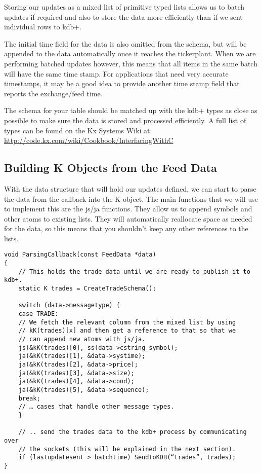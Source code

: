 Storing our updates as a mixed list of primitive typed lists allows us to batch updates if required and also to
store the data more efficiently than if we sent individual rows to kdb+.

The initial time field for the data is also omitted from the schema, but will be appended to the data automatically
once it reaches the tickerplant. When we are performing batched updates however, this means that all items in the
same batch will have the same time stamp. For applications that need very accurate timestamps, it may be a good idea
to provide another time stamp field that reports the exchange/feed time.

The schema for your table should be matched up with the kdb+ types as close as possible to make sure the data is
stored and processed efficiently.  A full list of types can be found on the Kx Systems Wiki at: 
\url{http://code.kx.com/wiki/Cookbook/InterfacingWithC}

\subsection{Building K Objects from the Feed Data}

With the data structure that will hold our updates defined, we can start to parse the data from the callback into
the K object. The main functions that we will use to implement this are the js/ja functions. They allow us to append
symbols and other atoms to existing lists. They will automatically reallocate space as needed for the data, so this
means that you shouldn't keep any other references to the lists.

\begin{lstlisting}
void ParsingCallback(const FeedData *data)
{
	// This holds the trade data until we are ready to publish it to kdb+.
	static K trades = CreateTradeSchema();

	switch (data->messagetype) {
	case TRADE:
	// We fetch the relevant column from the mixed list by using
	// kK(trades)[x] and then get a reference to that so that we
	// can append new atoms with js/ja.
	js(&kK(trades)[0], ss(data->cstring_symbol);
	ja(&kK(trades)[1], &data->systime);
	ja(&kK(trades)[2], &data->price);
	ja(&kK(trades)[3], &data->size);
	ja(&kK(trades)[4], &data->cond);
	ja(&kK(trades)[5], &data->sequence);
	break;
	// … cases that handle other message types.
	}

	// .. send the trades data to the kdb+ process by communicating over
	// the sockets (this will be explained in the next section).
	if (lastupdatesent > batchtime) SendToKDB(“trades”, trades);
}
\end{lstlisting}

